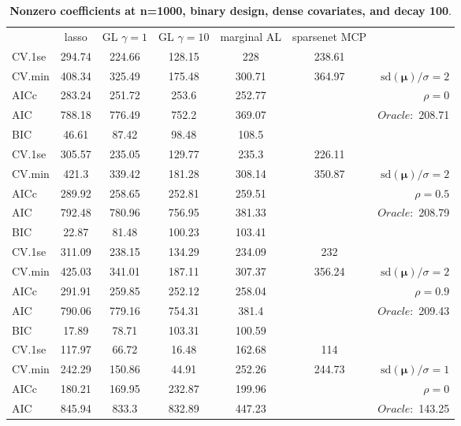 \clearpage
\begin{table}\vspace{-.5cm}
\caption[l]{ { \bf Nonzero coefficients at n=1000, binary design, 
dense covariates, and  decay  100}.}
\vspace{-.5cm}
\footnotesize{}
\begin{center}
\begin{tabular}{l*{5}{c}|r}
& lasso & GL $\gamma=1$ & GL $\gamma=10$ & marginal AL & sparsenet MCP  & \\
 \cline{1-7}
CV.1se & 294.74 & 224.66 & 128.15 & 228 & 238.61 & \\
CV.min & 408.34 & 325.49 & 175.48 & 300.71 & 364.97 &  $\mathrm{sd}(\mathbf{\mu})/\sigma=2$ \\
AICc & 283.24 & 251.72 & 253.6 & 252.77 & & $\rho=0$ \\
AIC & 788.18 & 776.49 & 752.2 & 369.07 & &  \multirow{2}{*}{$Oracle: $ 208.71} \\
BIC & 46.61 & 87.42 & 98.48 & 108.5 & &  \\
 \hline 
CV.1se & 305.57 & 235.05 & 129.77 & 235.3 & 226.11 & \\
CV.min & 421.3 & 339.42 & 181.28 & 308.14 & 350.87 &  $\mathrm{sd}(\mathbf{\mu})/\sigma=2$ \\
AICc & 289.92 & 258.65 & 252.81 & 259.51 & & $\rho=0.5$ \\
AIC & 792.48 & 780.96 & 756.95 & 381.33 & &  \multirow{2}{*}{$Oracle: $ 208.79} \\
BIC & 22.87 & 81.48 & 100.23 & 103.41 & &  \\
 \hline 
CV.1se & 311.09 & 238.15 & 134.29 & 234.09 & 232 & \\
CV.min & 425.03 & 341.01 & 187.11 & 307.37 & 356.24 &  $\mathrm{sd}(\mathbf{\mu})/\sigma=2$ \\
AICc & 291.91 & 259.85 & 252.12 & 258.04 & & $\rho=0.9$ \\
AIC & 790.06 & 779.16 & 754.31 & 381.4 & &  \multirow{2}{*}{$Oracle: $ 209.43} \\
BIC & 17.89 & 78.71 & 103.31 & 100.59 & &  \\
 \hline 
CV.1se & 117.97 & 66.72 & 16.48 & 162.68 & 114 & \\
CV.min & 242.29 & 150.86 & 44.91 & 252.26 & 244.73 &  $\mathrm{sd}(\mathbf{\mu})/\sigma=1$ \\
AICc & 180.21 & 169.95 & 232.87 & 199.96 & & $\rho=0$ \\
AIC & 845.94 & 833.3 & 832.89 & 447.23 & &  \multirow{2}{*}{$Oracle: $ 143.25} \\

\end{tabular}
\end{center}
\end{table}
